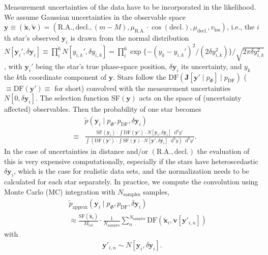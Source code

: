 \documentclass[iop,revtex4,numberedappendix,appendixfloats]{emulateapj}
\newcommand{\vect}[1]{\boldsymbol{#1}}
\newcommand*\Diff[1]{\mathop{}\!\mathrm{d^#1}}
\begin{document}
Measurement uncertainties of the data have to be incorporated in the likelihood. We assume Gaussian uncertainties in the observable space $\vect{y} \equiv (\tilde{\vect{x}},\tilde{\vect{v}})=(\text{R.A.},\text{decl.},(m-M),\mu_\text{R.A.} \cdot \cos (\text{decl.}),\mu_\text{decl.},v_\text{los})$, i.e., the $i$th star's observed $\vect{y}_i$ is drawn from the normal distribution $N[{\vect{y}_i}',\delta \vect{y}_i] \equiv \prod_i^6 N[{y_{i,k}}',\delta y_{i,k}] = \prod_i^6 \exp \{-(y_{k}-{y_{i,k}}')^2/ (2 \delta y_{i,k}^2) \} / \sqrt{2 \pi \delta y_{i,k}^2}$, with ${\vect{y}_i}'$ being the star's true phase-space position, $\delta \vect{y}_i$ its uncertainty, and $y_k$ the $k$th coordinate component of $\vect{y}$. Stars follow the $\text{DF}(\vect{J}[\vect{y}' \mid p_\Phi] \mid p_\text{DF})$ ($\equiv \text{DF}(\vect{y}') \equiv$ for short) convolved with the measurement uncertainties $N[0,\delta \vect{y}_i]$. The selection function SF$(\vect{y})$ acts on the space of (uncertainty affected) observables. Then the probability of one star becomes
\begin{eqnarray}
&&\tilde{p}(\vect{y}_i \mid p_\Phi,p_\text{DF},\delta \vect{y}_i)\nonumber\\
& \equiv& \frac{\text{SF}(\vect{y}_i) \cdot \int \text{DF}(\vect{y}') \cdot N[\vect{y}_i,\delta \vect{y}_i] \Diff{6} y'}{\int \left( \text{DF}(\vect{y}') \cdot \int \text{SF}(\vect{y}) \cdot N[\vect{y}',\delta \vect{y}_i] \Diff{6} y \right) \Diff{6}y'}.
\end{eqnarray}
In the case of uncertainties in distance and/or $(\text{R.A.},\text{decl.})$ the evaluation of this is very expensive computationally, especially if the stars have heteroscedastic $\delta \vect{y}_i$, which is the case for realistic data sets, and the normalization needs to be calculated for each star separately. In practice, we compute the convolution using Monte Carlo (MC) integration with $N_\text{samples}$ samples,
\begin{eqnarray}
&&\tilde{p}_\text{approx}(\vect{y}_i \mid p_\Phi,p_\text{DF},\delta \vect{y}_i) \nonumber\\
&&\approx \frac{ \text{SF}(\tilde{\vect{x}}_i)}{M_\text{tot}} \cdot \frac{1}{N_\text{samples}} \sum_n^{N_\text{samples}} \text{DF}(\tilde{\vect{x}}_i,\vect{v}[\vect{y}'_{i,n}]) \label{eq:errorconv}
\end{eqnarray}
with
\begin{eqnarray}
\vect{y}'_{i,n} \sim N[\vect{y}_i,\delta \vect{y}_i].\nonumber
\end{eqnarray}
\end{document}
